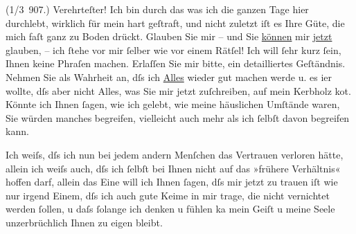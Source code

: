 \pstart
           \noindent{}\centering{}\label{K_L03112-1v}\label{K_L03112-1h} (1/3 907.)\pend
           {\bigskip}
\pstart
           \noindent{}Verehrteſter! Ich bin durch das was ich die ganzen
               Tage hier durchlebt, wirklich für mein \label{K_L03112-2v}\label{K_L03112-2h} hart geſtraft, und nicht zuletzt iſt es Ihre
               Güte, die mich faſt ganz zu Boden drückt. Glauben Sie mir – und Sie \uline{können} mir \uline{jetzt}
               glauben, – ich ſtehe vor mir ſelber wie vor einem Rätſel! Ich will ſehr kurz ſein,
               Ihnen keine Phraſen machen. Erlaſſen Sie mir bitte, ein
               detailliertes Geſtänd{\pb}nis.
               Nehmen Sie als Wahrheit an, dſs ich \uline{Alles} wieder gut
               machen werde u. es i{\geminationm}er wollte, dſs aber nicht Alles,
               was Sie mir jetzt zuſchreiben, auf mein Kerbholz ko{\geminationm}t.
               Könnte ich Ihnen ſagen, wie ich gelebt, wie meine häuslichen Umſtände waren, Sie
               würden manches begreifen, vielleicht auch mehr als ich ſelbſt davon begreifen
               kann.\pend
           
\pstart
           Ich weiſs, dſs ich nun bei jedem andern Menſchen das Vertrauen verloren hätte, allein
               ich weiſs auch, dſs ich ſelbſt bei Ihnen nicht {\pb}auf das »frühere Verhältnis«
               hoffen darf, allein das Eine will ich Ihnen ſagen, dſs mir jetzt zu trauen iſt wie
               nur irgend Einem, dſs ich auch gute Keime in mir trage, die nicht vernichtet werden
               ſollen, u daſs ſolange ich denken u fühlen ka{\geminationn} mein
               Geiſt u meine Seele unzerbrüchlich Ihnen zu eigen bleibt.\pend
           
